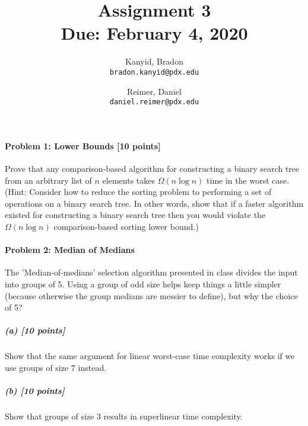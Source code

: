 \documentclass[11pt]{article}
\title{\bf Assignment 3 \\[2ex]
\rm\normalsize Due: February 4, 2020}
\date{}
\author{
  Kanyid, Bradon\\
  \texttt{bradon.kanyid@pdx.edu}
  \and
  Reimer, Daniel\\
  \texttt{daniel.reimer@pdx.edu}
}
\begin{document}
\maketitle

\paragraph{Problem 1: Lower Bounds [10 points]}
Prove that any comparison-based algorithm for constructing a binary search tree from an arbitrary list of $n$ elements takes $\Omega(n \log n)$ time in the worst case. (Hint: Consider how to reduce the sorting problem to performing a set of operations on a binary search tree. In other words, show that if a faster algorithm existed for constructing a binary search tree then you would violate the $\Omega(n \log n)$ comparison-based sorting lower bound.)


\paragraph{Problem 2: Median of Medians}
The 'Median-of-medians' selection algorithm presented in class divides the input into groups of 5. Using a group of odd size helps keep things a little simpler (because otherwise the group medians are messier to define), but why the choice of 5?
\subparagraph{(a) [10 points]}
Show that the same argument for linear worst-case time complexity works if we use groups of size 7 instead.


\subparagraph{(b) [10 points]}
Show that groups of size 3 results in superlinear time complexity.

\end{document}
